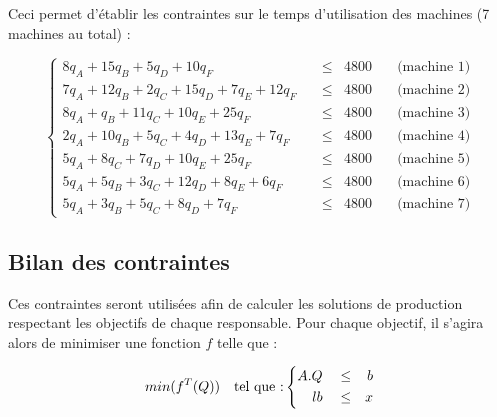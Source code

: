 \documentclass[paper=a4, fontsize=11pt]{report}
\numberwithin{equation}{section}		%
\numberwithin{figure}{section}			%
\numberwithin{table}{section}				%
\begin{document}
Ceci permet d'établir les contraintes sur le temps d'utilisation des machines (7 machines au total) : 

\begin{equation}
  \left\{
    \begin{aligned}
8q_A + 15q_B +  5q_D + 10q_F \quad & \leq & 4800 & \quad \text{(machine 1)} \\
7q_A + 12q_B + 2q_C  + 15q_D + 7q_E  + 12q_F \quad & \leq & 4800 & \quad \text{(machine 2)} \\
8q_A +   q_B + 11q_C + 10q_E + 25q_F \quad & \leq & 4800 & \quad \text{(machine 3)} \\
2q_A + 10q_B + 5q_C  +  4q_D + 13q_E + 7q_F  \quad & \leq & 4800 & \quad \text{(machine 4)} \\
5q_A + 8q_C  +  7q_D + 10q_E + 25q_F \quad & \leq & 4800 & \quad \text{(machine 5)} \\
5q_A +  5q_B + 3q_C  + 12q_D + 8q_E  + 6q_F  \quad & \leq & 4800 & \quad \text{(machine 6)} \\
5q_A +  3q_B + 5q_C  + 8q_D  + 7q_F  \quad & \leq & 4800 & \quad \text{(machine 7)} 
    \end{aligned}
  \right.
\label{tps_travail}
\end{equation}

\subsection{Bilan des contraintes}

Ces contraintes seront utilisées afin de calculer les solutions de production respectant les objectifs de chaque responsable. Pour chaque objectif, il s'agira alors de minimiser une fonction $f$ telle que :

\begin{equation}
  min(f^T(Q)) \quad \text{tel que :} \quad \\
   \left\{
    \begin{aligned}
A.Q \quad & \leq & b \\
lb \quad & \leq & x \\
    \end{aligned}
  \right.
\end{equation}
\end{document}
